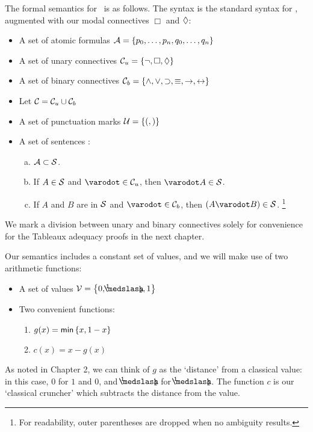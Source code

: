 The formal semantics for \GoModal\ is as follows. The syntax is the standard syntax for \CPL, augmented with our modal connectives $\Box$ and $\Diamond$:
\vspace*{-12pt}
\begin{singlespace}
	\begin{itemize}
		\item A set of atomic formulas $\mathcal{A} = \left\{{ p_0, \dots, p_n, q_0, \dots, q_n }\right\}$
		\item A set of unary connectives $\mathcal{C}_u = \left\{{ \neg,\Box, \Diamond }\right\}$
		\item A set of binary connectives $\mathcal{C}_b = \left\{{ \wedge, \vee, \supset, \equiv, \rightarrow, \leftrightarrow }\right\}$
		\item Let $ \mathcal{C} = \mathcal{C}_u \cup \mathcal{C}_b $
		\item A set of punctuation marks $ \mathcal{U} = \left\{{ ( , ) }\right\}$
		\item A set of sentences \Sentences:
		\begin{enumerate}[(a)]
			\item $ \mathcal{A} \subset \mathcal{S} $.
			\item If $ A \in \mathcal{S} $ and $\varodot \in \UnaryConnectives $, then $ \varodot A \in \Sentences $.
			\item If $ A $ and $ B $ are in $ \mathcal{S} $ and $ \varodot \in \BinaryConnectives $, then $ (A \varodot B) \in \Sentences $.
							\footnote{For readability, outer parentheses are dropped when no ambiguity results.}
		\end{enumerate}
	\end{itemize}
\end{singlespace}
\noindent We mark a division between unary and binary connectives solely for convenience for the Tableaux adequacy proofs in the next chapter.

Our semantics includes a constant set of values, and we will make use of two arithmetic functions:
\begin{singlespace}
\begin{itemize}
	\item A set of values $ \Values = \set{ 0, \oneHalf , 1 } $
	\item Two convenient functions:
	\begin{enumerate} 
		\item $ g(x) = \mathsf{min}\left\{{ x, 1 - x }\right\} $
		\item $ c(x) = x - g(x) $
	\end{enumerate} 
\end{itemize}
\end{singlespace}
%
\noindent As noted in Chapter 2, we can think of $g$ as the `distance' from a classical value: in this case, $0$ for $1$ and $0$, and $\oneHalf$ for $\oneHalf$. The function $c$ is our `classical cruncher' which subtracts the distance from the value.

